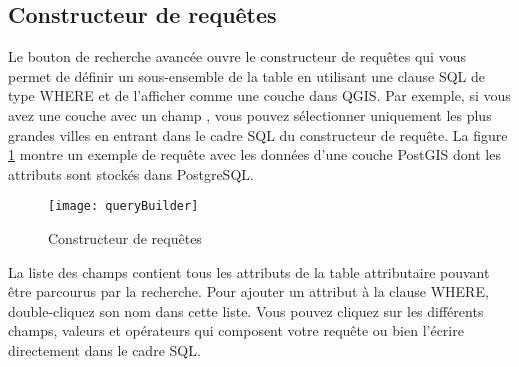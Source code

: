 \begin{itemize}
\subsection{Constructeur de requêtes}\label{sec:query_builder}


Le bouton de recherche avancée ouvre le constructeur de requêtes qui vous permet de définir un sous-ensemble de la table en utilisant une clause SQL de type WHERE et de l'afficher comme une couche dans QGIS. Par exemple, si vous avez une couche  avec un champ , vous pouvez sélectionner uniquement les plus grandes villes en entrant  dans le cadre SQL du constructeur de requête. La figure \ref{fig:query_builder} montre un exemple de requête avec les données d'une couche PostGIS dont les attributs sont stockés dans PostgreSQL.

\begin{figure}[ht]
  \begin{center}
    \caption{Constructeur de requêtes \nixcaption}\label{fig:query_builder}\smallskip
    \texttt{[image: queryBuilder]}
  \end{center}
\end{figure}

La liste des champs contient tous les attributs de la table attributaire pouvant être parcourus par la recherche. Pour ajouter un attribut à la clause WHERE, double-cliquez son nom dans cette liste. Vous pouvez cliquez sur les différents champs, valeurs et opérateurs qui composent votre requête ou bien l'écrire directement dans le cadre SQL.


\end{itemize}
